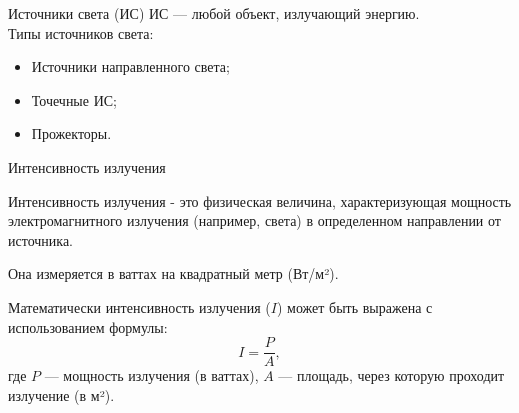 \documentclass{beamer}
\begin{document}
	\begin{frame}{Источники света (ИС)}
		ИС --- любой объект, излучающий энергию. \\
		Типы источников света:
		\begin{itemize}
			\item Источники направленного света;
			\item Точечные ИС;
			\item Прожекторы.
		\end{itemize}



	\end{frame}

	\begin{frame}{Интенсивность излучения}

		Интенсивность излучения - это физическая величина, характеризующая мощность электромагнитного излучения (например, света) в определенном направлении от источника. 
		
		Она измеряется в ваттах на квадратный метр (Вт/м²).

		Математически интенсивность излучения ($I$) может быть выражена с использованием формулы:
		\[
			I= \frac{P}{A}
			,
		\]
		где
    $P$ --- мощность излучения (в ваттах),
    $A$ --- площадь, через которую проходит излучение (в м²).
		
		

		\note{

		}

	\end{frame}
\end{document}
